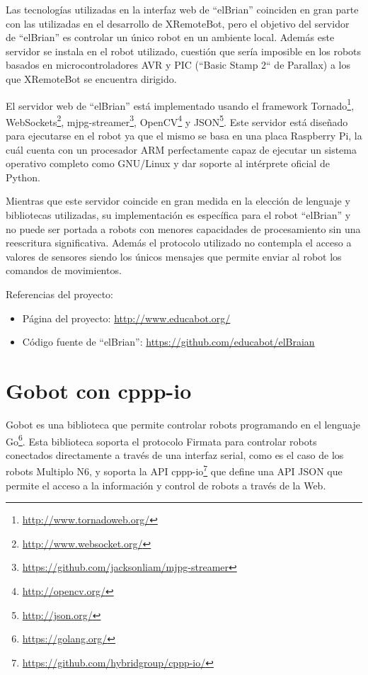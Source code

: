 Las tecnologías utilizadas en la interfaz web de ``elBrian'' coinciden en gran
parte con las utilizadas en el desarrollo de XRemoteBot, pero el objetivo del
servidor de ``elBrian'' es controlar un único robot en un ambiente local.
Además este servidor
se instala en el robot utilizado,  cuestión que sería imposible en los
robots basados en
microcontroladores AVR y PIC (``Basic Stamp 2`` de Parallax)
a los que XRemoteBot se encuentra dirigido.


El servidor web de ``elBrian'' está implementado usando el framework
Tornado\footnote{\url{http://www.tornadoweb.org/}},
WebSockets\footnote{\url{http://www.websocket.org/}},
mjpg-streamer\footnote{\url{https://github.com/jacksonliam/mjpg-streamer}},
OpenCV\footnote{\url{http://opencv.org/}}
y JSON\footnote{\url{http://json.org/}}.
Este servidor está diseñado para ejecutarse
en el robot ya que el mismo se basa en una placa Raspberry Pi, la cuál
cuenta con un procesador ARM perfectamente capaz de ejecutar un sistema
operativo completo como GNU/Linux y dar soporte al intérprete oficial de
Python.

Mientras que este servidor coincide en gran medida en la elección de lenguaje
y bibliotecas utilizadas, su implementación es específica para el robot ``elBrian''
y no puede ser portada a robots con menores capacidades de procesamiento
sin una reescritura significativa. Además el protocolo utilizado no contempla
el acceso a valores de sensores siendo los únicos mensajes que permite enviar
al robot los comandos de movimientos.

Referencias del proyecto:
\begin{itemize}
    \item Página del proyecto: \url{http://www.educabot.org/}
    \item Código fuente de ``elBrian'': \url{https://github.com/educabot/elBraian}
\end{itemize}

\section{Gobot con cppp-io}

Gobot
es una biblioteca que permite controlar robots programando en el lenguaje
Go\footnote{\url{https://golang.org/}}. Esta biblioteca soporta el
protocolo Firmata
para controlar robots
conectados directamente a través de una interfaz serial, como es el caso
de los robots Multiplo N6, y soporta la API
cppp-io\footnote{\url{https://github.com/hybridgroup/cppp-io/}}
que define una API JSON
que permite el acceso a la información y control de robots a través de la Web.

